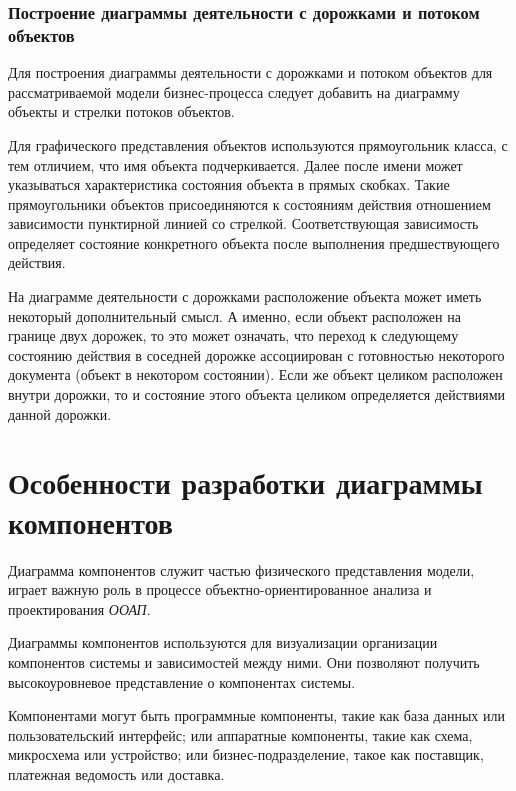 \documentclass[a4paper,12pt]{report}
\begin{document}
\subsubsection*{Построение диаграммы деятельности с дорожками и потоком объектов}

Для построения диаграммы деятельности с дорожками и потоком объектов для рассматриваемой модели бизнес-процесса следует добавить на диаграмму объекты и стрелки потоков объектов. 

Для графического представления объектов	 используются прямоугольник класса, с тем отличием, что имя объекта подчеркивается. Далее после имени может указываться характеристика состояния объекта в прямых скобках. Такие прямоугольники объектов присоединяются к состояниям действия отношением зависимости пунктирной линией со стрелкой. Соответствующая зависимость определяет состояние конкретного объекта после выполнения предшествующего действия.

На диаграмме деятельности с дорожками расположение объекта может иметь некоторый дополнительный смысл. А именно, если объект расположен на границе двух дорожек, то это может означать, что переход к следующему состоянию действия в соседней дорожке ассоциирован с готовностью некоторого документа (объект в некотором состоянии). Если же объект целиком расположен внутри дорожки, то и состояние этого объекта целиком определяется действиями данной дорожки.


\section{Особенности разработки диаграммы компонентов}
Диаграмма компонентов служит частью физического представления модели, играет важную роль в процессе объектно-ориентированное анализа и проектирования \textit{ООАП}. 

Диаграммы компонентов используются для визуализации организации компонентов системы и зависимостей между ними. Они позволяют получить высокоуровневое представление о компонентах системы.

Компонентами могут быть программные компоненты, такие как база данных или пользовательский интерфейс; или аппаратные компоненты, такие как схема, микросхема или устройство; или бизнес-подразделение, такое как поставщик, платежная ведомость или доставка.
\end{document}
